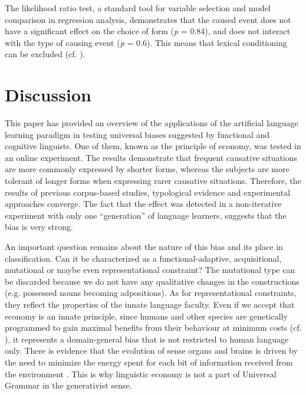 \documentclass[output=paper]{langsci/langscibook}
\begin{document}
The likelihood ratio test, a standard tool for variable selection and model comparison in regression analysis, demonstrates that the caused event does not have a significant effect on the choice of form (\textit{p} = 0.84), and does not interact with the type of causing event (\textit{p} = 0.6). This means that lexical conditioning can be excluded (cf. \citealt{SmithWonnacott2010}). 

\section{Discussion}\label{sec:levshina:4}

This paper has provided an overview of the applications of the artificial language learning paradigm in testing universal biases suggested by functional and cognitive linguists. One of them, known as the principle of economy, was tested in an online experiment. The results demonstrate that frequent causative situations are more commonly expressed by shorter forms, whereas the subjects are more tolerant of longer forms when expressing rarer causative situations. Therefore, the results of previous corpus-based studies, typological evidence and experimental approaches converge. The fact that the effect was detected in a non-iterative experiment with only one “generation” of language learners, suggests that the bias is very strong.

An important question remains about the nature of this bias and its place in  classification. Can it be characterized as a functional-adaptive, acquisitional, mutational or maybe even representational constraint? The mutational type can be discarded because we do not have any qualitative changes in the constructions (e.g. possessed nouns becoming adpositions). As for representational constraints, they reflect the properties of the innate language faculty. Even if we accept that economy is an innate principle, since humans and other species are genetically programmed to gain maximal benefits from their behaviour at minimum costs (cf. \citealt{ParkerSmith1990}), it represents a domain-general bias that is not restricted to human language only. There is evidence that the evolution of sense organs and brains is driven by the need to minimize the energy spent for each bit of information received from the environment \citep[3]{Stone2015}. This is why linguistic economy is not a part of Universal Grammar in the generativist sense. 
\end{document}
